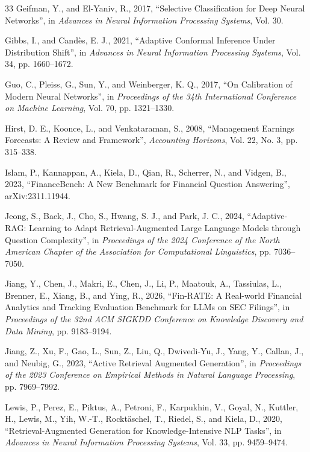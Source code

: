\begin{thebibliography}{33}
Geifman, Y., and El-Yaniv, R., 2017, ``Selective Classification for Deep Neural Networks'', in \emph{Advances in Neural Information Processing Systems}, Vol. 30.

Gibbs, I., and Cand\`es, E. J., 2021, ``Adaptive Conformal Inference Under Distribution Shift'', in \emph{Advances in Neural Information Processing Systems}, Vol. 34, pp. 1660--1672.

Guo, C., Pleiss, G., Sun, Y., and Weinberger, K. Q., 2017, ``On Calibration of Modern Neural Networks'', in \emph{Proceedings of the 34th International Conference on Machine Learning}, Vol. 70, pp. 1321--1330.

Hirst, D. E., Koonce, L., and Venkataraman, S., 2008, ``Management Earnings Forecasts: A Review and Framework'', \emph{Accounting Horizons}, Vol. 22, No. 3, pp. 315--338.

Islam, P., Kannappan, A., Kiela, D., Qian, R., Scherrer, N., and Vidgen, B., 2023, ``FinanceBench: A New Benchmark for Financial Question Answering'', arXiv:2311.11944.

Jeong, S., Baek, J., Cho, S., Hwang, S. J., and Park, J. C., 2024, ``Adaptive-RAG: Learning to Adapt Retrieval-Augmented Large Language Models through Question Complexity'', in \emph{Proceedings of the 2024 Conference of the North American Chapter of the Association for Computational Linguistics}, pp. 7036--7050.

Jiang, Y., Chen, J., Makri, E., Chen, J., Li, P., Maatouk, A., Tassiulas, L., Brenner, E., Xiang, B., and Ying, R., 2026, ``Fin-RATE: A Real-world Financial Analytics and Tracking Evaluation Benchmark for LLMs on SEC Filings'', in \emph{Proceedings of the 32nd ACM SIGKDD Conference on Knowledge Discovery and Data Mining}, pp. 9183--9194.

Jiang, Z., Xu, F., Gao, L., Sun, Z., Liu, Q., Dwivedi-Yu, J., Yang, Y., Callan, J., and Neubig, G., 2023, ``Active Retrieval Augmented Generation'', in \emph{Proceedings of the 2023 Conference on Empirical Methods in Natural Language Processing}, pp. 7969--7992.

Lewis, P., Perez, E., Piktus, A., Petroni, F., Karpukhin, V., Goyal, N., Kuttler, H., Lewis, M., Yih, W.-T., Rockt\"aschel, T., Riedel, S., and Kiela, D., 2020, ``Retrieval-Augmented Generation for Knowledge-Intensive NLP Tasks'', in \emph{Advances in Neural Information Processing Systems}, Vol. 33, pp. 9459--9474.


\end{thebibliography}
